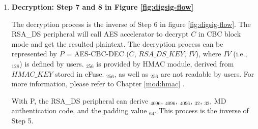 \documentclass[main\_\_EN.tex]{subfiles}
\begin{document}
\begin{enumerate}

    \item {\bfseries Decryption: Step 7 and 8 in Figure \ref{fig:digsig-flow}}


        The decryption process is the inverse of Step 6 in figure \ref{fig:digsig-flow}. The RSA\_DS peripheral will call AES accelerator to decrypt \begin{math}C\end{math} in CBC block mode and get the resulted plaintext. The decryption process can be represented by \begin{math}P\end{math} = AES-CBC-DEC (\begin{math}C\end{math}, \begin{math}RSA\_DS\_KEY\end{math}, \begin{math}IV\end{math}), where \begin{math}IV\end{math} (i.e., \begin{math}[IV]_{128}\end{math}) is defined by users. \begin{math}[RSA\_DS\_KEY]_{256}\end{math} is provided by HMAC module, derived from \begin{math}HMAC\_KEY\end{math} stored in eFuse. \begin{math}[RSA\_DS\_KEY]_{256}\end{math}, as well as \begin{math}[HMAC\_KEY]_{256}\end{math} are not readable by users. For more information, please refer to Chapter \ref{mod:hmac} \textit{}.

        With P, the RSA\_DS peripheral can derive \begin{math}[Y]_{4096}\end{math}, \begin{math}[M]_{4096}\end{math}, \begin{math}[\overline{r}]_{4096}\end{math}, \begin{math}[M^{\prime}]_{32}\end{math}, \begin{math}[L]_{32}\end{math}, MD authentication code, and the padding value \begin{math}[\beta]_{64} \end{math}. This process is the inverse of Step 5.


\end{enumerate}
\end{document}
